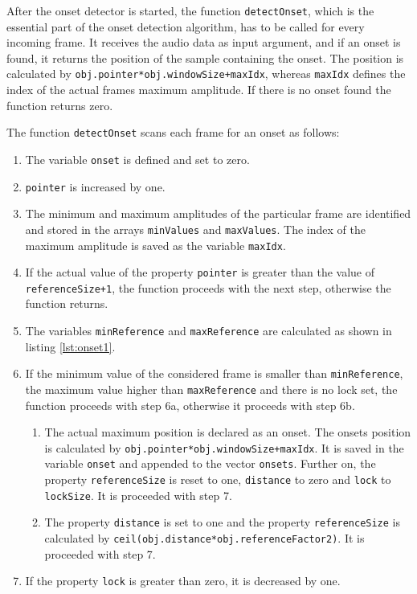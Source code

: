 After the onset detector is started, the function \lstinline{detectOnset}, which is the essential part of the onset detection algorithm, has to be called for every incoming frame. It receives the audio data as input argument, and if an onset is found, it returns the position of the sample containing the onset. The position is calculated by \lstinline{obj.pointer*obj.windowSize+maxIdx}, whereas \lstinline{maxIdx} defines the index of the actual frames maximum amplitude. If there is no onset found the function returns zero.

The function \lstinline{detectOnset} scans each frame for an onset as follows:

\begin{enumerate}
	\item The variable \lstinline{onset} is defined and set to zero.
	\item \lstinline{pointer} is increased by one.
	\item The minimum and maximum amplitudes of the particular frame are identified and stored in the arrays \lstinline{minValues} and \lstinline{maxValues}. The index of the maximum amplitude is saved as the variable \lstinline{maxIdx}.
	\item If the actual value of the property \lstinline{pointer} is greater than the value of \lstinline{referenceSize+1}, the function proceeds with the next step, otherwise the function returns.
	\item The variables \lstinline{minReference} and \lstinline{maxReference} are calculated as shown in listing \ref{lst:onset1}.
	\item  If the minimum value of the considered frame is smaller than \lstinline{minReference}, the maximum value higher than \lstinline{maxReference} and there is no lock set, the function proceeds with step 6a, otherwise it proceeds with step 6b.
	\begin{enumerate}
		\item The actual maximum position is declared as an onset. The onsets position is calculated by \lstinline{obj.pointer*obj.windowSize+maxIdx}. It is saved in the variable \lstinline{onset} and appended to the vector \lstinline{onsets}. Further on, the property \lstinline{referenceSize} is reset to one, \lstinline{distance} to zero and \lstinline{lock} to \lstinline{lockSize}. It is proceeded with step 7.
		
		\item The property \lstinline{distance} is set to one and the property \lstinline{referenceSize} is calculated by \lstinline{ceil(obj.distance*obj.referenceFactor2)}. It is proceeded with step 7.
	\end{enumerate}
	\item If the property \lstinline{lock} is	greater than zero, it is decreased by one.				
\end{enumerate}

